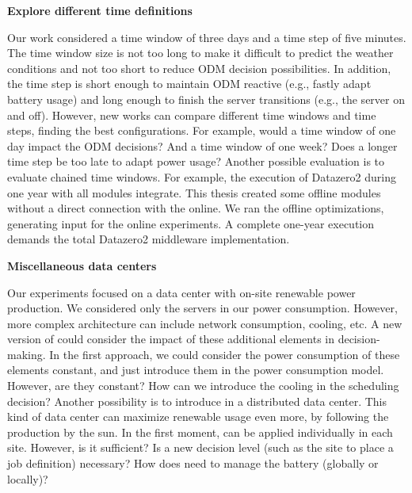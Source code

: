 \textbf{Explore different time definitions}

Our work considered a time window of three days and a time step of five minutes. The time window size is not too long to make it difficult to predict the weather conditions and not too short to reduce ODM decision possibilities. In addition, the time step is short enough to maintain ODM reactive (e.g., fastly adapt battery usage) and long enough to finish the server transitions (e.g., the server on and off). However, new works can compare different time windows and time steps, finding the best configurations. For example, would a time window of one day impact the ODM decisions? And a time window of one week? Does a longer time step be too late to adapt power usage? Another possible evaluation is to evaluate chained time windows. For example, the execution of Datazero2 during one year with all modules integrate. This thesis created some offline modules without a direct connection with the online. We ran the offline optimizations, generating input for the online experiments. A complete one-year execution demands the total Datazero2 middleware implementation. 

\textbf{Miscellaneous data centers}

Our experiments focused on a data center with on-site renewable power production. We considered only the servers in our power consumption. However, more complex architecture can include network consumption, cooling, etc. A new version of \emph{\systemName} could consider the impact of these additional elements in decision-making. In the first approach, we could consider the power consumption of these elements constant, and just introduce them in the power consumption model. However, are they constant? How can we introduce the cooling in the scheduling decision? Another possibility is to introduce \emph{\systemName} in a distributed data center. This kind of data center can maximize renewable usage even more, by following the production by the sun. In the first moment, \emph{\systemName} can be applied individually in each site. However, is it sufficient? Is a new decision level (such as the site to place a job definition) necessary? How does \emph{\systemName} need to manage the battery (globally or locally)?

